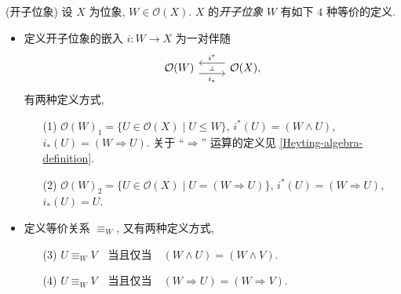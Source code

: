 \begin{propdef}
	{(开子位象)}
	设 $X$ 为位象, $W\in\mathcal O(X)$. $X$ 的\emph{开子位象} $W$ 有如下 $4$ 种等价的定义.
	\begin{itemize}
		\item 定义开子位象的嵌入 $i\colon W\to X$ 为一对伴随
		$$\begin{tikzcd}[ampersand replacement=\&]
			{\mathcal O(W)} \& {\mathcal O(X),}
			\arrow[""{name=0, anchor=center, inner sep=0}, "{i^*}"', shift right=2, from=1-2, to=1-1]
			\arrow[""{name=1, anchor=center, inner sep=0}, "{i_*}"', shift right=2, from=1-1, to=1-2]
			\arrow["\dashv"{anchor=center, rotate=-90}, draw=none, from=0, to=1]
		\end{tikzcd}$$
		有两种定义方式,
		\begin{enumerate}
			\item[(1)] $\mathcal O(W)_1 = \{U\in\mathcal O(X)\mid U\leq W\}$,
			$i^* (U) = (W\land U)$,
			$i_*(U) = (W\Rightarrow U).$
			关于 ``$\Rightarrow$'' 运算的定义见 \ref{Heyting-algebra-definition}.
			\item[(2)] $\mathcal O(W)_2 = \{U\in\mathcal O(X)\mid U = (W\Rightarrow U)\}$,
			$i^*(U)=(W\Rightarrow U)$,
			$i_* (U) = U$.
		\end{enumerate}
		\item 定义等价关系 $\equiv_W$, 又有两种定义方式,
		\begin{enumerate}
			\item[(3)]
			$U \equiv_W V \quad \text{当且仅当} \quad (W\land U) = (W \land V).$
			\item[(4)]
			$U \equiv_W V \quad \text{当且仅当} \quad (W\Rightarrow U) = (W\Rightarrow V).$
		\end{enumerate}
	\end{itemize}
\end{propdef}
